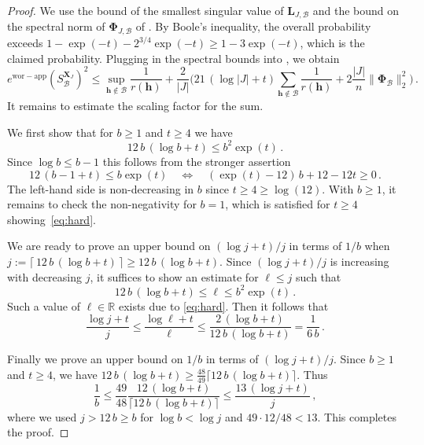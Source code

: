 \documentclass[10pt,a4paper]{amsart}
\newcommand{\ewc}{e^{\mathrm{wor-app}}}
\begin{document}
\begin{proof} We use the bound of the smallest singular value of $\bm L_{J,\mathcal B}$ and the bound on the spectral norm of $\bm\Phi_{J,\mathcal B}$ of .
    By Boole's inequality, the overall probability exceeds $1-\exp(-t)-2^{3/4}\exp(-t) \ge 1-3\exp(-t)$, which is the claimed probability.
    Plugging in the spectral bounds into , we obtain
    \begin{equation*}
        \ewc(S_{\mathcal B}^{\bm X_J})^2
        \le \sup_{\bm h\notin\mathcal B} \frac{1}{r(\bm h)}
        + 
        \frac{2}{|J|} \Big( 21 \,(\log|J|+t) \sum_{\bm h\notin\mathcal B} \frac{1}{r(\bm h)} + 2\frac{|J|}{n} \|\bm\Phi_{\mathcal B}\|_{2}^2\Big) \,.
    \end{equation*}
    It remains to estimate the scaling factor for the sum.

    We first show that for $b\ge 1$ and $t\ge 4$ we have
    \begin{equation}\label{eq:hard}
        12\,b\,(\log b+t)
        \le b^2\exp(t) \,.
    \end{equation}
    Since $\log b \le b-1$ this follows from the stronger assertion
    \begin{equation*}
        12\,(b-1+t)
        \le b\exp(t)
        \quad\Leftrightarrow\quad
        (\exp(t)-12)\,b +12-12t
        \ge 0 \,.
    \end{equation*}
    The left-hand side is non-decreasing in $b$ since $t\ge 4 \ge \log(12)$.
    With $b\ge 1$, it remains to check the non-negativity for $b=1$, which is satisfied for $t\ge 4$ showing~\eqref{eq:hard}.

    We are ready to prove an upper bound on $(\log j+t)/j$ in terms of $1/b$ when $j := \lceil\,12\,b\,(\log b+t)\,\rceil \ge 12\,b\,(\log b+t)$.
    Since $(\log j+t)/j$ is increasing with decreasing $j$, it suffices to show an estimate for $\ell\le j$ such that
    \begin{equation*}
        12\,b\,(\log b+t)
        \le \ell
        \le b^2\exp(t) \,.
    \end{equation*}
    Such a value of $\ell\in\mathds R$ exists due to \eqref{eq:hard}.
    Then it follows that
    \begin{equation*}
        \frac{\log j+t}{j}
        \le \frac{\log\ell+t}{\ell}
        \le \frac{2 \, (\log b + t)}{12 \, b \, (\log b + t)}
        = \frac{1}{6\,b} \,.
    \end{equation*}
    
    Finally we prove an upper bound on $1/b$ in terms of $(\log j+t)/j$.
    Since $b\ge 1$ and $t\ge 4$, we have $12 \, b \, (\log b+t) \ge \frac{48}{49} \lceil 12 \, b \, (\log b+t)\rceil$.
    Thus
    \begin{equation*}
        \frac{1}{b}
        \le \frac{49}{48} \frac{12 \, (\log b+t)}{\lceil 12 \, b \, (\log b+t)\rceil}
        \le \frac{13 \, (\log j+t)}{j} \,,
    \end{equation*}
    where we used $j > 12\,b \ge b$ for $\log b < \log j$ and $49\cdot 12/48 <13$.
    This completes the proof.
\end{proof} 
\end{document}
